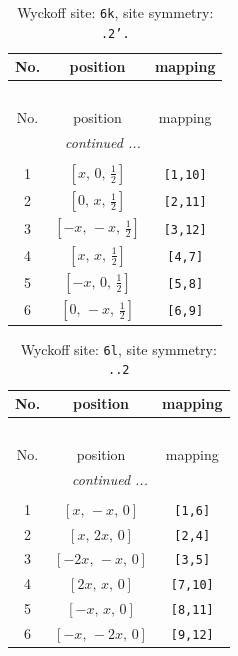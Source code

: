 \documentclass[fleqn,8pt]{jsarticle}
\begin{document}
\renewcommand{\arraystretch}{1.2}
\begin{longtable}{ccc}
\caption{Wyckoff site: {\tt 6k}, site symmetry: {\tt .2'.}}
 \\
 \hline \hline
No. & position & mapping \\ \hline \endfirsthead

\multicolumn{2}{l}{\tablename\ \thetable{}} \\
 \hline \hline
No. & position & mapping \\ \hline \endhead

 \hline \hline
\multicolumn{2}{r}{\footnotesize\it continued ...} \\ \endfoot

 \hline \hline
\multicolumn{2}{r}{} \\ \endlastfoot

1 & $\left[ x,\, 0,\, \frac{1}{2} \right]$ & {\tt [1,10]} \\ \hline
2 & $\left[ 0,\, x,\, \frac{1}{2} \right]$ & {\tt [2,11]} \\ \hline
3 & $\left[ - x,\, - x,\, \frac{1}{2} \right]$ & {\tt [3,12]} \\ \hline
4 & $\left[ x,\, x,\, \frac{1}{2} \right]$ & {\tt [4,7]} \\ \hline
5 & $\left[ - x,\, 0,\, \frac{1}{2} \right]$ & {\tt [5,8]} \\ \hline
6 & $\left[ 0,\, - x,\, \frac{1}{2} \right]$ & {\tt [6,9]} \\
\end{longtable}
\renewcommand{\arraystretch}{1.2}
\begin{longtable}{ccc}
\caption{Wyckoff site: {\tt 6l}, site symmetry: {\tt ..2}}
 \\
 \hline \hline
No. & position & mapping \\ \hline \endfirsthead

\multicolumn{2}{l}{\tablename\ \thetable{}} \\
 \hline \hline
No. & position & mapping \\ \hline \endhead

 \hline \hline
\multicolumn{2}{r}{\footnotesize\it continued ...} \\ \endfoot

 \hline \hline
\multicolumn{2}{r}{} \\ \endlastfoot

1 & $\left[ x,\, - x,\, 0 \right]$ & {\tt [1,6]} \\ \hline
2 & $\left[ x,\, 2 x,\, 0 \right]$ & {\tt [2,4]} \\ \hline
3 & $\left[ - 2 x,\, - x,\, 0 \right]$ & {\tt [3,5]} \\ \hline
4 & $\left[ 2 x,\, x,\, 0 \right]$ & {\tt [7,10]} \\ \hline
5 & $\left[ - x,\, x,\, 0 \right]$ & {\tt [8,11]} \\ \hline
6 & $\left[ - x,\, - 2 x,\, 0 \right]$ & {\tt [9,12]} \\
\end{longtable}
\end{document}
